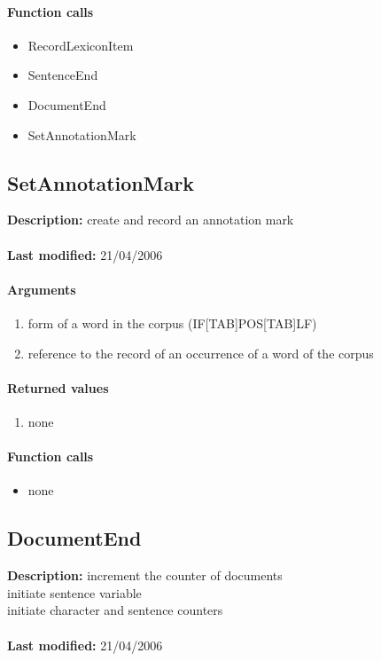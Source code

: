 \paragraph{Function calls}
\begin{itemize}
\item RecordLexiconItem
\item SentenceEnd
\item DocumentEnd
\item SetAnnotationMark
\end{itemize}

\subsection{SetAnnotationMark}
\textbf{Description:} create and record an annotation mark\\
\\\textbf{Last modified:} 21/04/2006

\paragraph{Arguments}
\begin{enumerate}
\item form of a word in the corpus (IF[TAB]POS[TAB]LF)
\item reference to the record of an occurrence of a word of the corpus
\end{enumerate}

\paragraph{Returned values}
\begin{enumerate}
\item none
\end{enumerate}

\paragraph{Function calls}
\begin{itemize}
\item none
\end{itemize}

\subsection{DocumentEnd}
\textbf{Description:} increment the counter of documents\\
initiate sentence variable\\
initiate character and sentence counters\\
\\\textbf{Last modified:} 21/04/2006

